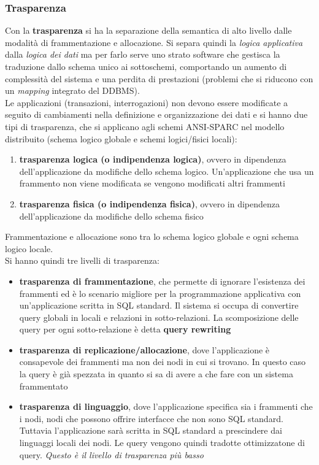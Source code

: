 \documentclass[a4paper,12pt, oneside]{book}
\begin{document}
\subsubsection{Trasparenza}
Con la \textbf{trasparenza} si ha la separazione della semantica di alto livello
dalle modalità di frammentazione e allocazione. Si separa quindi la
\textit{logica applicativa} dalla \textit{logica dei dati} ma per farlo serve
uno strato software che gestisca la traduzione dallo schema unico ai
sottoschemi, comportando un aumento di complessità del sistema e una perdita di
prestazioni (problemi che si riducono con un \textit{mapping} integrato del
DDBMS).\\
Le applicazioni (transazioni, interrogazioni) non devono essere modificate a
seguito di cambiamenti nella definizione e organizzazione dei dati e si hanno
due tipi di trasparenza, che si applicano agli schemi ANSI-SPARC nel modello
distribuito (schema logico globale e schemi logici/fisici locali):
\begin{enumerate}
  \item \textbf{trasparenza logica (o indipendenza logica)}, ovvero in
  dipendenza dell'applicazione da modifiche dello schema logico. Un'applicazione
  che usa un frammento non viene modificata se vengono modificati altri
  frammenti
  \item \textbf{trasparenza fisica (o indipendenza fisica)}, ovvero in
  dipendenza dell'applicazione da modifiche dello schema fisico
\end{enumerate}
Frammentazione e allocazione sono tra lo schema logico globale e ogni schema
logico locale. \\
Si hanno quindi tre livelli di trasparenza:
\begin{itemize}
  \item \textbf{trasparenza di frammentazione}, che permette di ignorare
  l'esistenza dei frammenti ed è lo scenario migliore per la programmazione
  applicativa con un'applicazione scritta in SQL standard. Il sistema si occupa
  di convertire query globali in locali e relazioni in sotto-relazioni. La
  scomposizione delle query per ogni sotto-relazione è detta \textbf{query
    rewriting} 
  \item \textbf{trasparenza di replicazione/allocazione}, dove l'applicazione è
  consapevole dei frammenti ma non dei nodi in cui si trovano. In questo caso la
  query è già spezzata in quanto si sa di avere a che fare con un sistema
  frammentato
  \item \textbf{trasparenza di linguaggio}, dove l'applicazione specifica sia
  i frammenti che i nodi, nodi che possono offrire interfacce che non sono SQL
  standard. Tuttavia l'applicazione sarà scritta in SQL standard a prescindere
  dai linguaggi locali dei nodi. Le query vengono quindi tradotte
  ottimizzatone di query. \textit{Questo è il livello di trasparenza più
    basso}
\end{itemize}
\end{document}
